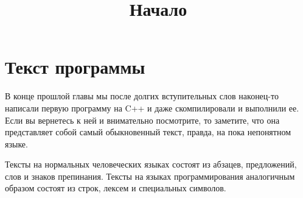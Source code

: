 \documentclass{article}
\begin{document}


\title{\textbf{\Huge Начало}}
\author{}
\date{}

\maketitle 

\section*{Текст программы}

В конце прошлой главы мы после долгих вступительных слов наконец-то написали первую программу на C++ и даже скомпилировали и выполнили ее. Если вы вернетесь к ней и внимательно посмотрите, то заметите, что она представляет собой самый обыкновенный текст, правда, на пока непонятном языке.

Тексты на нормальных человеческих языках состоят из абзацев, предложений, слов и знаков препинания. Тексты на языках программирования аналогичным образом состоят из строк, лексем и специальных символов.
\end{document}
